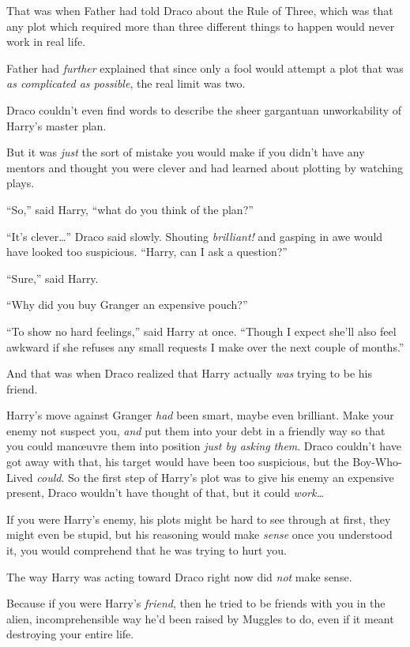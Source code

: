 That was when Father had told Draco about the Rule of Three, which was that any plot which required more than three different things to happen would never work in real life.

Father had \emph{further} explained that since only a fool would attempt a plot that was \emph{as complicated as possible}, the real limit was two.

Draco couldn’t even find words to describe the sheer gargantuan unworkability of Harry’s master plan.

But it was \emph{just} the sort of mistake you would make if you didn’t have any mentors and thought you were clever and had learned about plotting by watching plays.

“So,” said Harry, “what do you think of the plan?”

“It’s clever…” Draco said slowly. Shouting \emph{brilliant!} and gasping in awe would have looked too suspicious. “Harry, can I ask a question?”

“Sure,” said Harry.

“Why did you buy Granger an expensive pouch?”

“To show no hard feelings,” said Harry at once. “Though I expect she’ll also feel awkward if she refuses any small requests I make over the next couple of months.”

And that was when Draco realized that Harry actually \emph{was} trying to be his friend.

Harry’s move against Granger \emph{had} been smart, maybe even brilliant. Make your enemy not suspect you, \emph{and} put them into your debt in a friendly way so that you could manœuvre them into position \emph{just by asking them}. Draco couldn’t have got away with that, his target would have been too suspicious, but the Boy-Who-Lived \emph{could}. So the first step of Harry’s plot was to give his enemy an expensive present, Draco wouldn’t have thought of that, but it could \emph{work…}

If you were Harry’s enemy, his plots might be hard to see through at first, they might even be stupid, but his reasoning would make \emph{sense} once you understood it, you would comprehend that he was trying to hurt you.

The way Harry was acting toward Draco right now did \emph{not} make sense.

Because if you were Harry’s \emph{friend}, then he tried to be friends with you in the alien, incomprehensible way he’d been raised by Muggles to do, even if it meant destroying your entire life.

